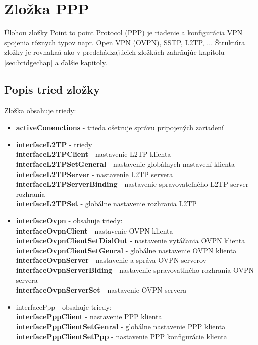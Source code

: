 \section{Zložka PPP}
Úlohou zložky Point to point Protocol (PPP) je riadenie  a konfigurácia VPN spojenia rôznych typov napr. Open VPN (OVPN), SSTP, L2TP, ... Štruktúra zložky je rovnakaá ako v predchádzajúcich zložkách zahrňujúc kapitolu \ref{sec:bridgechap} a ďalšie kapitoly.
\subsection{Popis tried zložky}
Zložka obsahuje triedy:
\begin{itemize}
\item \textbf{activeConenctions} - trieda ošetruje  správu pripojených zariadení
\item \textbf{interfaceL2TP} - triedy\\
\textbf{interfaceL2TPClient} - nastavenie L2TP klienta\\
\textbf{interfaceL2TPSetGeneral} - nastavenie  globálnych nastavení klienta\\
\textbf{interfaceL2TPServer} - nastavenie L2TP servera\\
\textbf{interfaceL2TPServerBinding} - nastavenie spravovateľného L2TP server rozhrania\\
\textbf{interfaceL2TPSet} - globálne nastavenie rozhrania L2TP
\item \textbf{interfaceOvpn} - obsahuje triedy:\\
\textbf{interfaceOvpnClient} - nastavenie OVPN klienta\\
\textbf{interfaceOvpnClientSetDialOut} - nastavenie vytáčania OVPN klienta\\
\textbf{interfaceOvpnClientSetGenral} - globálne nastavenie OVPN klienta\\
\textbf{interfaceOvpnServer} - nastavenie a správa OVPN serverov\\
\textbf{interfaceOvpnServerBiding} - nastavenie spravovatľného rozhrania OVPN servera\\
\textbf{interfaceOvpnServerSet} - nastavenie OVPN servera
\item interfacePpp - obsahuje triedy:\\
\textbf{interfacePppClient} - nastavenie PPP klienta\\
\textbf{interfacePppClientSetGenral} - globálne nastavenie PPP klienta\\
\textbf{interfacePppClientSetPpp} - nastavenie PPP konfigurácie klienta\\

\end{itemize}
